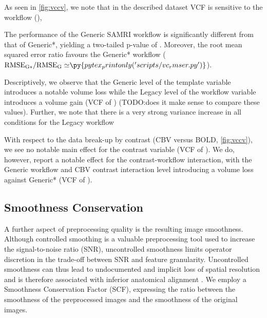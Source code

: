 As seen in \cref{fig:vccv}, we note that in the described dataset VCF is sensitive to the workflow (),

The performance of the Generic SAMRI workflow is significantly different from that of Generic*, yielding a two-tailed p-value of .
Moreover, the root mean squared error ratio favours the Generic* workflow
($\mathrm{RMSE_{G*}/RMSE_{G}\simeq} \py{pytex_printonly('scripts/vc_rmser.py')}$).

Descriptively, we observe that the Generic level of the template variable introduces a notable volume loss
while the Legacy level of the workflow variable introduces a volume gain
(VCF of ) (TODO:does it make sense to compare these values).
Further, we note that there is a very strong variance increase in all conditions for the Legacy workflow

With respect to the data break-up by contrast (CBV versus BOLD, \cref{fig:vccv}), we see no notable main effect for the contrast variable
(VCF of ).
We do, however, report a notable effect for the contrast-workflow interaction, with the Generic workflow and CBV contrast interaction level introducing a volume loss
against Generic* (VCF of ).


\subsection{Smoothness Conservation}

A further aspect of preprocessing quality is the resulting image smoothness.
Although controlled smoothing is a valuable preprocessing tool used to increase the signal-to-noise ratio (SNR), uncontrolled smoothness limits operator discretion in the trade-off between SNR and feature granularity.
Uncontrolled smoothness can thus lead to undocumented and implicit loss of spatial resolution and is therefore associated with inferior anatomical alignment \cite{fmriprep}.
We employ a Smoothness Conservation Factor (SCF), expressing the ratio between the smoothness of the preprocessed images and the smoothness of the original images.

